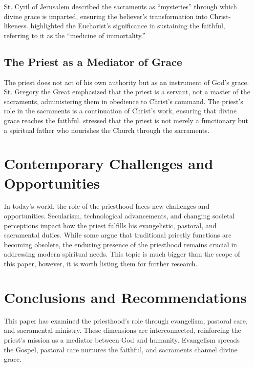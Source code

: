 \documentclass[12pt,doc]{apa7}   	%
\begin{document}
St. Cyril of Jerusalem \citep{early_church_akin} described the sacraments as ``mysteries'' through which divine grace is imparted, ensuring the believer’s transformation into Christ-likeness. \citet{priesthood_chrysostom} highlighted the Eucharist’s significance in sustaining the faithful, referring to it as the ``medicine of immortality.''

\subsection{The Priest as a Mediator of Grace}

The priest does not act of his own authority but as an instrument of God’s grace. St. Gregory the Great \citep{early_church_akin} emphasized that the priest is a servant, not a master of the sacraments, administering them in obedience to Christ’s command.  The priest’s role in the sacraments is a continuation of Christ’s work, ensuring that divine grace reaches the faithful. \citet{priesthood_shenouda} stressed that the priest is not merely a functionary but a spiritual father who nourishes the Church through the sacraments.

\section{Contemporary Challenges and Opportunities}

In today’s world, the role of the priesthood faces new challenges and opportunities. Secularism, technological advancements, and changing societal perceptions impact how the priest fulfills his evangelistic, pastoral, and sacramental duties. While some argue that traditional priestly functions are becoming obsolete, the enduring presence of the priesthood remains crucial in addressing modern spiritual needs. This topic is much bigger than the scope of this paper, however, it is worth listing them for further research.

\clearpage
\section{Conclusions and Recommendations}

This paper has examined the priesthood’s role through evangelism, pastoral care, and sacramental ministry. These dimensions are interconnected, reinforcing the priest’s mission as a mediator between God and humanity. Evangelism spreads the Gospel, pastoral care nurtures the faithful, and sacraments channel divine grace.
\end{document}
